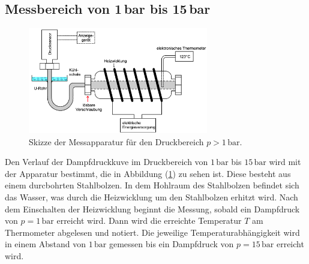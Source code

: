 \subsection{Messbereich von 1\,bar bis 15\,bar}
\label{sec:ZweiteDurchführung}
\begin{figure}[H]
    \centering
    \includegraphics[width=0.70\textwidth]{Zweite_Apparatur.png}
    \caption{Skizze der Messapparatur für den Druckbereich $p>1\,\unit{\bar}$. \cite{anleitungV203}}
    \label{fig:ZweiteApparatur}
\end{figure}
Den Verlauf der Dampfdruckkuve im Druckbereich von $1\,\unit{\bar}$ bis $15\,\unit{\bar}$ wird mit der Apparatur bestimmt, die in Abbildung (\ref{fig:ZweiteApparatur}) zu sehen ist. 
Diese besteht aus einem durcbohrten Stahlbolzen. In dem Hohlraum des Stahlbolzen befindet sich das Wasser, was durch die Heizwicklung um den Stahlbolzen erhitzt wird. Nach dem
Einschalten der Heizwicklung beginnt die Messung, sobald ein Dampfdruck von $p = 1\,\unit{\bar}$ erreicht wird. Dann wird die erreichte Temperatur $T$ am Thermometer abgelesen und notiert. 
Die jeweilige Temperaturabhängigkeit wird in einem Abstand von $1\,\unit{\bar}$ gemessen bis ein Dampfdruck von $p = 15\,\unit{\bar}$ erreicht wird.
